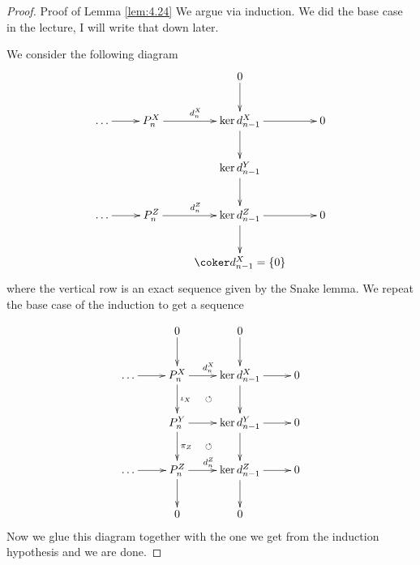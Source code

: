 \documentclass[twoside = false,	%
		headsepline,		%
		parskip = true,
		]{scrbook}						%
\begin{document}
    \begin{proof}{Proof of Lemma \ref{lem:4.24}}
        We argue via induction. We did the base case in the lecture, I will write that down later.

        We consider the following diagram
        \begin{equation*}
        \xymatrix {
                        &                          & 0 \ar[d] \\
            \dots \ar[r] & P_{n}^X \ar[r]^{d_n^X} & \ker d_{n-1}^X \ar[r] \ar[d]& 0 \\
            & & \ker d_{n-1}^Y \ar[d] \\
            \dots \ar[r] & P_{n}^Z \ar[r]^{d_n^Z} & \ker d_{n-1}^Z \ar[r] \ar[d] & 0 \\
            & & \coker d_{n-1}^X = \{0\}
        }
        \end{equation*}
        where the vertical row is an exact sequence given by the Snake lemma. We repeat the base case of the induction to get a sequence
        
        \begin{equation*}
        \xymatrix {
                        &  0 \ar[d] & 0 \ar[d] \\
            \dots \ar[r] & P_{n}^X \ar[d]^{\iota_{X}} \ar[r]^{d_n^X} & \ker d_{n-1}^X \ar[r] \ar[d]& 0 \\
            & P_{n}^Y \ar@{}[ur]|{\circlearrowleft} \ar[r] \ar[d]^{\pi_Z}& \ker d_{n-1}^Y \ar[d] \ar[r] & 0 \\
            \dots \ar[r] & P_{n}^Z \ar[r]^{d_n^Z} \ar@{}[ur]|{\circlearrowleft} \ar[d] & \ker d_{n-1}^Z \ar[r] \ar[d] & 0 \\
            & 0 &  0
        }
        \end{equation*}
        Now we glue this diagram together with the one we get from the induction hypothesis and we are done.
    \end{proof}
    
\printbibliography
\end{document}
